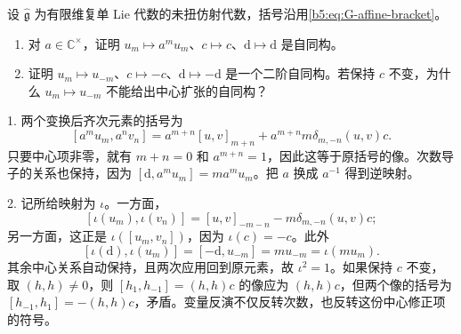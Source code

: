 \begin{exercise}\label{b5:ex:G-loop-coordinate-changes}
	设 \(\widehat{\mathfrak g}\) 为有限维复单 Lie 代数的未扭仿射代数，括号沿用\eqref{b5:eq:G-affine-bracket}。
	\begin{enumerate}
		\item 对 \(a\in\mathbb C^\times\)，证明 \(u_m\mapsto a^m u_m\)、\(c\mapsto c\)、\(\mathrm d\mapsto\mathrm d\) 是自同构。
		\item 证明 \(u_m\mapsto u_{-m}\)、\(c\mapsto-c\)、\(\mathrm d\mapsto-\mathrm d\) 是一个二阶自同构。若保持 \(c\) 不变，为什么 \(u_m\mapsto u_{-m}\) 不能给出中心扩张的自同构？
	\end{enumerate}
\end{exercise}
\begin{solution}
	1. 两个变换后齐次元素的括号为
	\[
		[a^m u_m,a^n v_n]
		=a^{m+n}[u,v]_{m+n}+a^{m+n}m\delta_{m,-n}(u,v)c.
	\]
	只要中心项非零，就有 \(m+n=0\) 和 \(a^{m+n}=1\)，因此这等于原括号的像。次数导子的关系也保持，因为 \([\mathrm d,a^m u_m]=m a^m u_m\)。把 \(a\) 换成 \(a^{-1}\) 得到逆映射。

	2. 记所给映射为 \(\iota\)。一方面，
	\[
		[\iota(u_m),\iota(v_n)]
		=[u,v]_{-m-n}-m\delta_{m,-n}(u,v)c;
	\]
	另一方面，这正是 \(\iota([u_m,v_n])\)，因为 \(\iota(c)=-c\)。此外
	\[
		[\iota(\mathrm d),\iota(u_m)]
		=[-\mathrm d,u_{-m}]=m u_{-m}=\iota(mu_m).
	\]
	其余中心关系自动保持，且两次应用回到原元素，故 \(\iota^2=1\)。如果保持 \(c\) 不变，取 \((h,h)\ne0\)，则 \([h_1,h_{-1}]=(h,h)c\) 的像应为 \((h,h)c\)，但两个像的括号为 \([h_{-1},h_1]=-(h,h)c\)，矛盾。变量反演不仅反转次数，也反转这份中心修正项的符号。
\end{solution}

